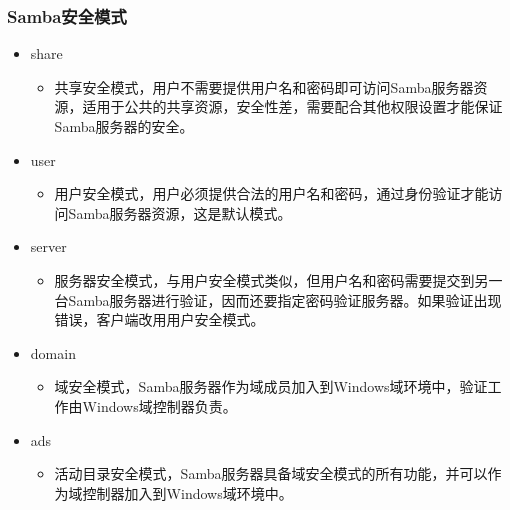 \documentclass[xcolor=svgnames,presentation]{beamer}
\begin{document}
\begin{frame}
\frametitle{Samba安全模式}
\label{sec-2-3}
\begin{itemize}

\item share
\label{sec-2-3-1}%
\begin{itemize}

\item 共享安全模式，用户不需要提供用户名和密码即可访问Samba服务器资源，适用于公共的共享资源，安全性差，需要配合其他权限设置才能保证Samba服务器的安全。
\label{sec-2-3-1-1}%
\end{itemize} %

\item user
\label{sec-2-3-2}%
\begin{itemize}

\item 用户安全模式，用户必须提供合法的用户名和密码，通过身份验证才能访问Samba服务器资源，这是默认模式。
\label{sec-2-3-2-1}%
\end{itemize} %

\item server
\label{sec-2-3-3}%
\begin{itemize}

\item 服务器安全模式，与用户安全模式类似，但用户名和密码需要提交到另一台Samba服务器进行验证，因而还要指定密码验证服务器。如果验证出现错误，客户端改用用户安全模式。
\label{sec-2-3-3-1}%
\end{itemize} %

\item domain
\label{sec-2-3-4}%
\begin{itemize}

\item 域安全模式，Samba服务器作为域成员加入到Windows域环境中，验证工作由Windows域控制器负责。
\label{sec-2-3-4-1}%
\end{itemize} %

\item ads
\label{sec-2-3-5}%
\begin{itemize}

\item 活动目录安全模式，Samba服务器具备域安全模式的所有功能，并可以作为域控制器加入到Windows域环境中。
\label{sec-2-3-5-1}%
\end{itemize} %
\end{itemize} %
\end{frame}
\end{document}
